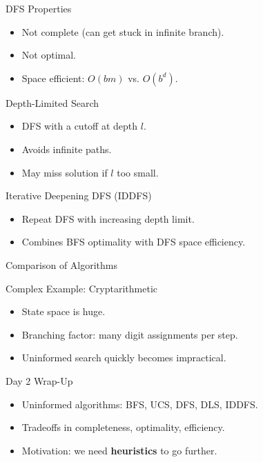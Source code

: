 \documentclass[aspectratio=169]{beamer}
\begin{document}
\begin{frame}{DFS Properties}
  \begin{itemize}
    \item Not complete (can get stuck in infinite branch).
    \item Not optimal.
    \item Space efficient: $O(bm)$ vs. $O(b^d)$.
  \end{itemize}
\end{frame}

\begin{frame}{Depth-Limited Search}
  \begin{itemize}
    \item DFS with a cutoff at depth $l$.
    \item Avoids infinite paths.
    \item May miss solution if $l$ too small.
  \end{itemize}
\end{frame}

\begin{frame}{Iterative Deepening DFS (IDDFS)}
  \begin{itemize}
    \item Repeat DFS with increasing depth limit.
    \item Combines BFS optimality with DFS space efficiency.
  \end{itemize}
\end{frame}

\begin{frame}{Comparison of Algorithms}
\end{frame}

\begin{frame}{Complex Example: Cryptarithmetic}
  \begin{itemize}
    \item State space is huge.
    \item Branching factor: many digit assignments per step.
    \item Uninformed search quickly becomes impractical.
  \end{itemize}
\end{frame}

\begin{frame}{Day 2 Wrap-Up}
  \begin{itemize}
    \item Uninformed algorithms: BFS, UCS, DFS, DLS, IDDFS.
    \item Tradeoffs in completeness, optimality, efficiency.
    \item Motivation: we need \textbf{heuristics} to go further.
  \end{itemize}
\end{frame}
\end{document}
